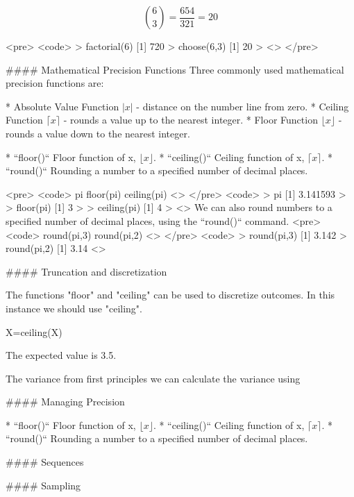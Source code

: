 \documentclass[a4paper,12pt]{article}
\begin{document}
\[ { 6 \choose 3} =\frac{654}{321}= 20\]


<pre>
<code>
> factorial(6)
[1] 720
> choose(6,3)
[1] 20
> 
<\code>
</pre>

#### {Mathematical Precision Functions}
Three commonly used mathematical precision functions are:
\begin{itemize}
	* Absolute Value Function $| x |$ - distance on the number line from zero.
	* Ceiling Function $\lceil x \rceil$ - rounds a value up to the nearest integer.
	* Floor Function  $\lfloor x \rfloor $ - rounds a value down to the nearest integer.
\end{itemize}
\begin{itemize}
	* ``floor()`` Floor function of x, $\lfloor x \rfloor$.
	* ``ceiling()`` Ceiling function of x, $\lceil x \rceil$.
	* ``round()`` Rounding a number to a specified number of decimal places.
\end{itemize}

<pre>
	<code>
	pi
	floor(pi)
	ceiling(pi)
	<\code>
</pre>
<code>
> pi
[1] 3.141593
>
> floor(pi)
[1] 3
>
> ceiling(pi)
[1] 4
>
<\code>
We can also round numbers to a specified number of decimal places, using the ``round()`` command.
<pre>
	<code>
	round(pi,3)
	round(pi,2)
	<\code>
</pre>
<code>
> round(pi,3)
[1] 3.142
> round(pi,2)
[1] 3.14
<\code>


#### {Truncation and discretization}

The functions "floor" and "ceiling" can be used to discretize outcomes. In this instance we should use "ceiling".
\begin{itemize}
* ``ceiling(X)}
* ``floor(X)}
* ``round(X,2)}
\end{itemize}
X=ceiling(X)



The expected value is 3.5.

The variance from first principles we can calculate the variance using

#### {Managing Precision}

\begin{itemize}
	* ``floor()`` Floor function of x, $\lfloor x \rfloor$.
	* ``ceiling()`` Ceiling function of x, $\lceil x \rceil$.
	* ``round()`` Rounding a number to a specified number of decimal places.
\end{itemize}

#### {Sequences}


#### {Sampling}
\end{document}

